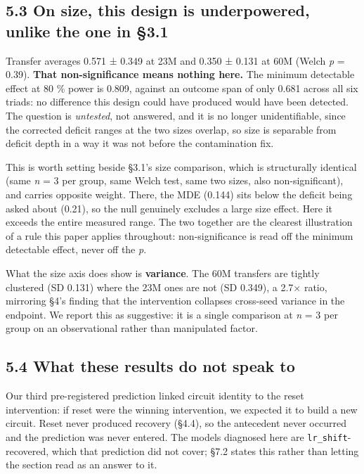 \documentclass[11pt]{article}
\begin{document}
\subsection{5.3 On size, this design is underpowered, unlike the one in §3.1}\label{on-size-this-design-is-underpowered-unlike-the-one-in-3.1}

Transfer averages 0.571 ± 0.349 at 23M and 0.350 ± 0.131 at 60M (Welch \emph{p} = 0.39). \textbf{That
non-significance means nothing here.} The minimum detectable effect at 80 \% power is 0.809,
against an outcome span of only 0.681 across all six triads: no difference this design could
have produced would have been detected. The question is \emph{untested}, not answered, and it is
no longer unidentifiable, since the corrected deficit ranges at the two sizes overlap, so
size is separable from deficit depth in a way it was not before the contamination fix.

This is worth setting beside §3.1's size comparison, which is structurally identical (same
\emph{n} = 3 per group, same Welch test, same two sizes, also non-significant), and carries
opposite weight. There, the MDE (0.144) sits below the deficit being asked about (0.21), so
the null genuinely excludes a large size effect. Here it exceeds the entire measured range.
The two together are the clearest illustration of a rule this paper applies throughout:
non-significance is read off the minimum detectable effect, never off the \emph{p}.

What the size axis does show is \textbf{variance}. The 60M transfers are tightly clustered
(SD 0.131) where the 23M ones are not (SD 0.349), a 2.7× ratio, mirroring §4's finding that
the intervention collapses cross-seed variance in the endpoint. We report this as suggestive:
it is a single comparison at \emph{n} = 3 per group on an observational rather than manipulated
factor.

\subsection{5.4 What these results do not speak to}\label{what-these-results-do-not-speak-to}

Our third pre-registered prediction linked circuit identity to the reset intervention: if
reset were the winning intervention, we expected it to build a new circuit. Reset never
produced recovery (§4.4), so the antecedent never occurred and the prediction was never
entered. The models diagnosed here are \texttt{lr\_shift}-recovered, which that prediction did not
cover; §7.2 states this rather than letting the section read as an answer to it.
\end{document}
